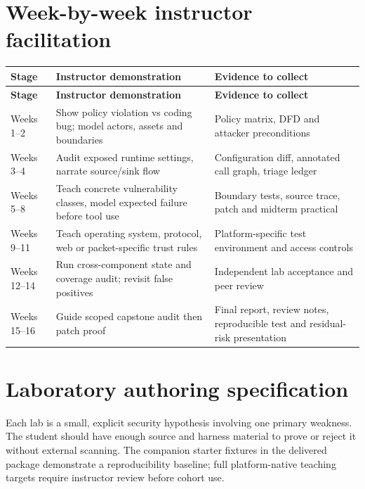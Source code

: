 \documentclass[10pt,letterpaper]{article}
\begin{document}
\section{Week-by-week instructor facilitation}
\begingroup\footnotesize\setlength\tabcolsep{3pt}
\begin{longtable}{>{\raggedright\arraybackslash}p{}>{\raggedright\arraybackslash}p{}>{\raggedright\arraybackslash}p{}}\toprule
\textbf{Stage} & \textbf{Instructor demonstration} & \textbf{Evidence to collect}\\\midrule\endfirsthead
\toprule \textbf{Stage} & \textbf{Instructor demonstration} & \textbf{Evidence to collect}\\\midrule\endhead
Weeks 1--2 & Show policy violation vs coding bug; model actors, assets and boundaries & Policy matrix, DFD and attacker preconditions\\\midrule
Weeks 3--4 & Audit exposed runtime settings, narrate source/sink flow & Configuration diff, annotated call graph, triage ledger\\\midrule
Weeks 5--8 & Teach concrete vulnerability classes, model expected failure before tool use & Boundary tests, source trace, patch and midterm practical\\\midrule
Weeks 9--11 & Teach operating system, protocol, web or packet-specific trust rules & Platform-specific test environment and access controls\\\midrule
Weeks 12--14 & Run cross-component state and coverage audit; revisit false positives & Independent lab acceptance and peer review\\\midrule
Weeks 15--16 & Guide scoped capstone audit then patch proof & Final report, review notes, reproducible test and residual-risk presentation\\\midrule
\bottomrule\end{longtable}\endgroup
\section{Laboratory authoring specification}
Each lab is a small, explicit security hypothesis involving one primary weakness. The student should have enough source and harness material to prove or reject it without external scanning. The companion starter fixtures in the delivered package demonstrate a reproducibility baseline; full platform-native teaching targets require instructor review before cohort use.
\end{document}
